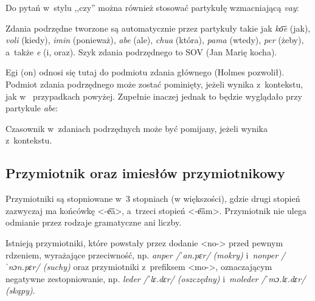 \begin{spacing}{1.1}

Do pytań w~stylu ,,czy'' można również stosować partykułę wzmacniającą \emph{vay}:


Zdania podrzędne tworzone są automatycznie przez partykuły takie jak \emph{ko͞e} 
(jak), \emph{voli} (kiedy), \emph{imin} (ponieważ), \emph{abe} (ale), 
\emph{chua} (która), \emph{pama} (wtedy), \emph{per} (żeby), a~także \emph{e} 
(i, oraz). Szyk zdania podrzędnego to SOV (Jan Marię kocha).



Egi (on) odnosi się tutaj do podmiotu zdania głównego (Holmes pozwolił). Podmiot 
zdania podrzędnego może zostać pominięty, jeżeli wynika z~kontekstu, jak w~
przypadkach powyżej. Zupełnie inaczej jednak to będzie wyglądało przy partykule 
\emph{abe}:


Czasownik w~zdaniach podrzędnych może być pomijany, jeżeli wynika z~kontekstu.


\subsection{Przymiotnik oraz imiesłów przymiotnikowy}

Przymiotniki są stopniowane w~3 stopniach (w większości), gdzie drugi stopień 
zazwyczaj ma końcówkę <-e͞a>, a~trzeci stopień <-e͞am>. Przymiotnik nie ulega 
odmianie przez rodzaje gramatyczne ani liczby.

Istnieją przymiotniki, które powstały przez dodanie <no-> przed pewnym rdzeniem,
wyrażające przeciwność, np. \emph{anper /ˈan.pɛr/ (mokry)} i~\emph{nonper 
/ˈnɔn.pɛr/ (suchy)} oraz przymiotniki z~prefiksem <mo->, oznaczającym negatywne 
zestopniowanie, np. \emph{leder /ˈlɛ.dɛr/ (oszczędny)} i~\emph{moleder 
/ˈmɔ.lɛ.dɛr/ (skąpy)}.


\end{spacing}
